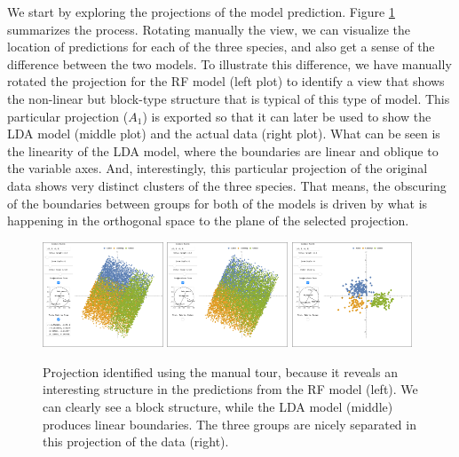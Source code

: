 \documentclass[]{interact}
\theoremstyle{plain}%
\theoremstyle{definition}
\theoremstyle{remark}
\begin{document}
We start by exploring the projections of the model prediction. Figure
\ref{proj1} summarizes the process. Rotating manually the view, we can
visualize the location of predictions for each of the three species, and
also get a sense of the difference between the two models. To illustrate
this difference, we have manually rotated the projection for the RF
model (left plot) to identify a view that shows the non-linear but
block-type structure that is typical of this type of model. This
particular projection (\(A_1\)) is exported so that it can later be used
to show the LDA model (middle plot) and the actual data (right plot).
What can be seen is the linearity of the LDA model, where the boundaries
are linear and oblique to the variable axes. And, interestingly, this
particular projection of the original data shows very distinct clusters
of the three species. That means, the obscuring of the boundaries
between groups for both of the models is driven by what is happening in
the orthogonal space to the plane of the selected projection.

\begin{figure}[ht]
\centerline{\includegraphics[width=0.32\textwidth]{figures/proj1_rf.png}
\includegraphics[width=0.32\textwidth]{figures/proj1_lda.png}
\includegraphics[width=0.32\textwidth]{figures/proj1_data.png}}
\caption{Projection identified using the manual tour, because it reveals an interesting structure in the predictions from the RF model (left). We can clearly see a block structure, while the LDA model (middle) produces linear boundaries. The three groups are nicely separated in this projection of the data (right).}
\label{proj1}
\end{figure}
\end{document}

